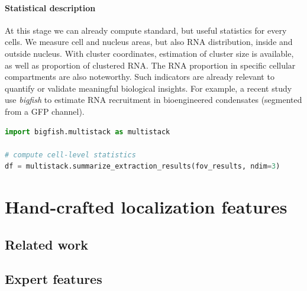 \paragraph{Statistical description}

At this stage we can already compute standard, but useful statistics for every cells.
We measure cell and nucleus areas, but also \ac{RNA} distribution, inside and outside nucleus.
With cluster coordinates, estimation of cluster size is available, as well as proportion of clustered \ac{RNA}.
The \ac{RNA} proportion in specific cellular compartments are also noteworthy.
Such indicators are already relevant to quantify or validate meaningful biological insights.
For example, a recent study~\cite{cochard_rna_2022} use \emph{bigfish} to estimate \ac{RNA} recruitment in bioengineered condensates (segmented from a \ac{GFP} channel).\\

\begin{minipage}{0.9\textwidth}
\begin{lstlisting}[language=Python]
import bigfish.multistack as multistack

# compute cell-level statistics
df = multistack.summarize_extraction_results(fov_results, ndim=3)
\end{lstlisting}
\end{minipage}

\section{Hand-crafted localization features} \label{sec:hand_features}


\subsection{Related work} \label{subsec:related_work_hand_features}


\subsection{Expert features} \label{subsec:expert_features}


